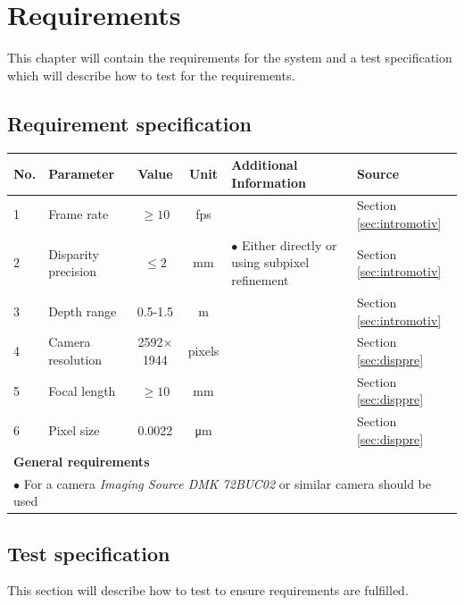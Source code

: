 \chapter{Requirements} \label{ch:req}
This chapter will contain the requirements for the system and a test specification which will describe how to test for the requirements.

\section{Requirement specification}
\begin{table}[ht!]
  \centering
  \begin{tabular}{l l c c p{4cm} p{2.5cm}}
  \toprule
  \textbf{No.} & \textbf{Parameter} & \textbf{Value} & \textbf{Unit} & \textbf{Additional Information} & \textbf{Source} \\
  \midrule
  1 & Frame rate & $\geq 10$ & fps & & Section \vref{sec:intromotiv} \\
  \midrule
  2 & Disparity precision & $\leq 2$ & mm & $\bullet$ Either directly or using subpixel refinement & Section \vref{sec:intromotiv}\\
  \midrule
  3 & Depth range & 0.5-1.5 & m & & Section \vref{sec:intromotiv} \\
  \midrule
  4 & Camera resolution & 2592$\times$1944 & pixels & & Section \vref{sec:disppre} \\
  \midrule
  5 & Focal length & $\geq 10$ & mm & & Section \vref{sec:disppre} \\
  \midrule
  6 & Pixel size & 0.0022 & \si{\micro\meter} & & Section \vref{sec:disppre} \\  
  \toprule
  \multicolumn{6}{l}{\textbf{General requirements}}\\
  \multicolumn{6}{l}{$\bullet$ For a camera \textit{Imaging Source DMK 72BUC02} or similar camera should be used}\\
  \bottomrule
  \end{tabular}
\end{table}
\section{Test specification}
This section will describe how to test to ensure requirements are fulfilled. \\

